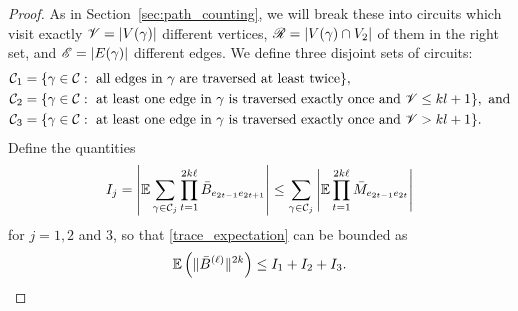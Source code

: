 \begin{proof}
As in Section~\ref{sec:path_counting}, we will break these into circuits
which visit exactly 
$\mathscr{V} = |V(\gamma)|$ different vertices, 
$\mathscr{R} = |V(\gamma) \cap V_2|$ of them in the right set, and
$\mathscr{E} = |E(\gamma)|$ different edges.
We define three disjoint sets of circuits:
\begin{align*}
    \mathcal{C}_1 & =
    \{\gamma \in \mathcal{C}:~\mbox{all edges in $\gamma$ are traversed at least twice} \}, \\
    \mathcal{C}_2 & =
    \{\gamma \in \mathcal{C}:~\mbox{at least one edge in $\gamma$ is traversed exactly once 
    and $\mathscr{V} \leq kl+1$} \},~\mbox{and} \\
    \mathcal{C}_3 & =
    \{\gamma \in \mathcal{C}:~\mbox{at least one edge in $\gamma$ is traversed exactly once 
    and $\mathscr{V} > kl+1$} \} .
\end{align*}
Define the quantities
\[
I_j
= 
\left|
\mathbb{E}
  \sum_{\gamma\in \mathcal{C}_j} 
  \prod_{t=1}^{2k\ell} \bar{B}_{e_{2t-1} e_{2t+1}} 
\right|
\leq
\sum_{\gamma \in \mathcal{C}_j}
\left|
\mathbb{E}
\prod_{t=1}^{2k\ell}
\bar{M}_{e_{2t-1} e_{2t}}
\right|
\]
for $j = 1, 2$ and 3, so that
\eqref{trace_expectation}
can be bounded as
\begin{align}\label{bound:I1+I2+I3}
\mathbb{E}\left(\|\bar{B}^{(\ell)}\|^{2k}\right)\leq I_1+I_2+I_3.
\end{align}


\end{proof}
